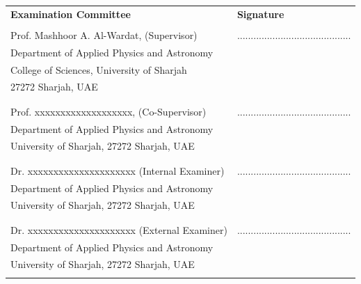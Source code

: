 \begin{tabular}{ l l  }
\textbf{\Large  Examination Committee} &               \textbf{\Large Signature}  \\
  &      \\
  Prof. Mashhoor A. Al-Wardat, (Supervisor)&              ..........................................\\
  Department of Applied Physics and Astronomy\\ College of Sciences, University of Sharjah\\ 27272 Sharjah, UAE\\
\color{blue}{\href{mailto:malwardat@sharjah.ac.ae}{malwardat@sharjah.ac.ae}} \\

  & \\
    Prof. xxxxxxxxxxxxxxxxxxx, (Co-Supervisor)&              ..........................................\\
  Department of Applied Physics and Astronomy\\  University of Sharjah, 27272 Sharjah, UAE\\
\color{blue}{\href{mailto:malwardat@sharjah.ac.ae}{malwardat@sharjah.ac.ae}} \\

  & \\
     Dr. xxxxxxxxxxxxxxxxxxxxx (Internal Examiner)&              ..........................................\\
  Department of Applied Physics and Astronomy\\  University of Sharjah, 27272 Sharjah, UAE\\
\color{blue}{\href{mailto:malwardat@sharjah.ac.ae}{malwardat@sharjah.ac.ae}} \\

 & \\
     Dr. xxxxxxxxxxxxxxxxxxxxx (External Examiner)&              ..........................................\\
  Department of Applied Physics and Astronomy\\  University of Sharjah, 27272 Sharjah, UAE\\
\color{blue}{\href{mailto:malwardat@sharjah.ac.ae}{malwardat@sharjah.ac.ae}} \\

\end{tabular}


